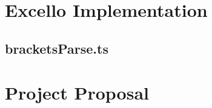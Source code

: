 \documentclass[12pt,a4paper,twoside,openright]{report}
\begin{document}




% 

%
% 


\pagestyle{headings}




%








\appendix

\chapter{Excello Implementation}

\section{bracketsParse.ts}
\label{appendix:parenthesis}
{\scriptsize}

\chapter{Project Proposal}



% 
\end{document}
